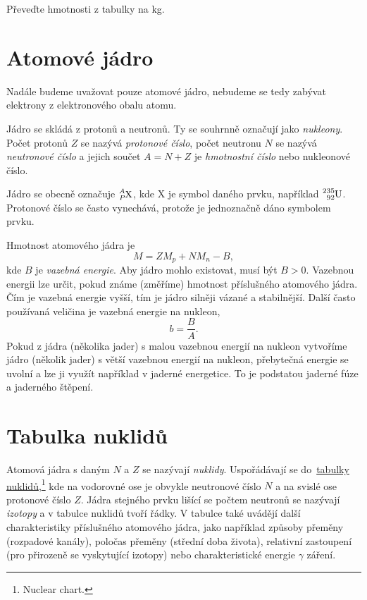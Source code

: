 \documentclass[a4paper,12pt,oneside]{article}
\theoremstyle{red}
\begin{document}
\begin{task}
    Převeďte hmotnosti z tabulky na kg.
\end{task}

\section{Atomové jádro}
    Nadále budeme uvažovat pouze atomové jádro, nebudeme se tedy zabývat elektrony z elektronového obalu atomu.

    Jádro se skládá z protonů a neutronů. Ty se souhrnně označují jako \emph{nukleony}.
    Počet protonů $Z$ se nazývá \emph{protonové číslo},
    počet neutronu $N$ se nazývá \emph{neutronové číslo}
    a jejich součet $A=N+Z$ je \emph{hmotnostní číslo} nebo nukleonové číslo.

    Jádro se obecně označuje $\ce{^{\it A}_{\it P}X}$, kde X je symbol daného prvku, například $\ce{^{235}_{92}U}$.
    Protonové číslo se často vynechává, protože je jednoznačně dáno symbolem prvku.

    Hmotnost atomového jádra je
    \begin{equation}
        M=ZM_{p}+NM_{n}-B,
    \end{equation}
    kde $B$ je \emph{vazebná energie}.
    Aby jádro mohlo existovat, musí být $B>0$.
    Vazebnou energii lze určit, pokud známe (změříme) hmotnost příslušného atomového jádra.
    Čím je vazebná energie vyšší, tím je jádro silněji vázané a stabilnější.
    Další často používaná veličina je vazebná energie na nukleon,
    \begin{equation}
        b=\frac{B}{A}.
    \end{equation}
    Pokud z jádra (několika jader) s malou vazebnou energií na nukleon vytvoříme jádro (několik jader) s větší vazebnou energií na nukleon, přebytečná energie se uvolní a lze ji využít například v jaderné energetice.
    To je podstatou jaderné fúze a jaderného štěpení.

\section{Tabulka nuklidů}
    Atomová jádra s daným $N$ a $Z$ se nazývají \emph{nuklidy}.
    Uspořádávají se do~\href{https://upload.wikimedia.org/wikipedia/commons/b/b5/NuclideMap_stitched.png}{tabulky nuklidů},\footnote{Nuclear chart.} kde na vodorovné ose je obvykle neutronové číslo $N$ a na svislé ose protonové číslo $Z$.
    Jádra stejného prvku lišící se počtem neutronů se nazývají \emph{izotopy} a v tabulce nuklidů tvoří řádky.
    V tabulce také uvádějí další charakteristiky příslušného atomového jádra, jako například způsoby přeměny (rozpadové kanály), poločas přeměny (střední doba života), relativní zastoupení (pro přirozeně se vyskytující izotopy) nebo charakteristické energie $\gamma$ záření.
\end{document}
